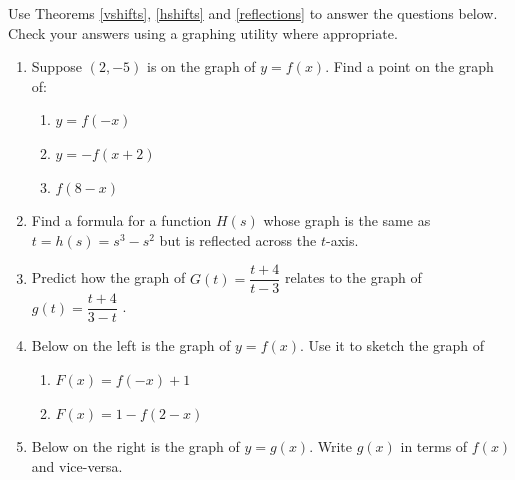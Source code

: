 \documentclass{ximera}
\begin{document}
\begin{example}  \label{reflectionsex}  

Use Theorems  \ref{vshifts},  \ref{hshifts} and \ref{reflections}  to answer the questions below.  Check your answers using a graphing utility where appropriate.
 
 \begin{enumerate}
 
 \item   Suppose $(2,-5)$ is on the graph of $y = f(x)$.  Find a point on the graph of:
 
 \begin{multicols}{3}
 
 \begin{enumerate}
 
 \item $y = f(-x)$
 
 \item $y = -f(x+2)$
 
 \item  \label{twotransxrefex} $f(8-x)$
 
 \end{enumerate}
 
 \end{multicols}
 
 \item  Find a formula for a function $H(s)$ whose graph is the same as $t=h(s) = s^3-s^2$ but is reflected across the $t$-axis.
 
 \item Predict how the graph of $G(t) = \dfrac{t+4}{t-3}$ relates to the graph of $g(t) =\dfrac{t+4}{3-t}$ . 
 
\item  Below on the left is the graph of $y = f(x)$.  Use it to sketch the graph of

  \begin{multicols}{2}
 
 \begin{enumerate}
 
 \item $F(x) = f(-x)+1$
 
  \item \label{twotransyrefex}  $F(x)= 1 - f(2-x)$
 
 \end{enumerate}
 
 \end{multicols}
 
 \item \label{gfromfrefex} Below on the right is the graph of $y = g(x)$.  Write $g(x)$ in terms of $f(x)$ and vice-versa.
 

\end{enumerate}
\end{example}
\end{document}
